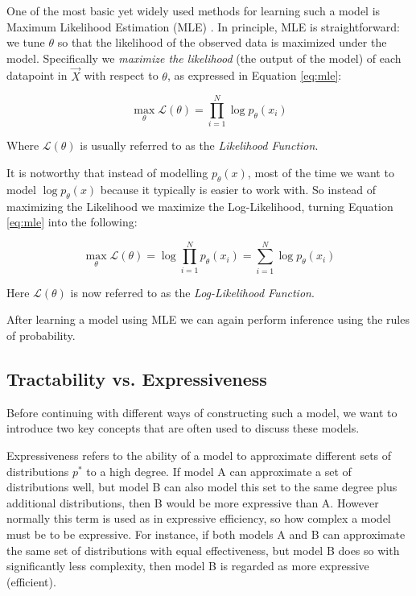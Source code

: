 One of the most basic yet widely used methods for learning such a model is Maximum Likelihood Estimation (MLE) \cite{ml_book}. 
In principle, MLE is straightforward: we tune $\theta$ so that the likelihood of the observed data is maximized under the model.
Specifically we \emph{maximize the likelihood} (the output of the model) of each datapoint in $\vec X$ with respect to $\theta$, as 
expressed in Equation \ref{eq:mle}: 

\begin{equation}
    \max_{\theta} \mathcal{L}(\theta) = \prod_{i=1}^{N} \log p_\theta(x_i)
    \label{eq:mle}
\end{equation}

Where $\mathcal{L}(\theta)$ is usually referred to as the \emph{Likelihood Function}.

It is notworthy that instead of modelling $p_\theta(x)$, most of the time we want to model $\log p_\theta(x)$ because it typically is easier to work with. 
So instead of maximizing the Likelihood we maximize the Log-Likelihood, turning Equation \ref{eq:mle} into the following:

\begin{equation}
    \max_{\theta} \mathcal{L}(\theta) = \log \prod_{i=1}^{N} p_\theta(x_i) = \sum_{i=1}^{N} \log p_\theta(x_i)
    \label{eq:log_mle}
\end{equation}

Here $\mathcal{L}(\theta)$ is now referred to as the \emph{Log-Likelihood Function}. 

After learning a model using MLE we can again perform inference using the rules of probability. 

\subsection{Tractability vs. Expressiveness}

Before continuing with different ways of constructing such a model, we want to introduce two key concepts that are often 
used to discuss these models. 

\begin{definition} [Expressiveness]
    Expressiveness refers to the ability of a model to approximate different sets of distributions $p^*$ to a high degree. If model A can approximate a set of 
    distributions well, but model B can also model this set to the same degree plus additional distributions, then B would be more expressive than A.
    However normally this term is used as in expressive efficiency, so how complex a model must be to be expressive.  For instance, if both models A and B can approximate the same set of distributions with equal effectiveness, but model B does so with significantly less complexity, then model B is regarded as more expressive (efficient).  \cite{pc_intro}
\end{definition}

